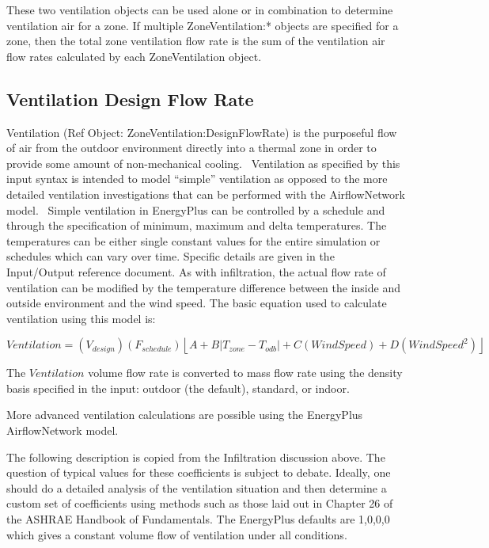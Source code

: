 These two ventilation objects can be used alone or in combination to determine ventilation air for a zone. If multiple ZoneVentilation:* objects are specified for a zone, then the total zone ventilation flow rate is the sum of the ventilation air flow rates calculated by each ZoneVentilation object.

\subsection{Ventilation Design Flow Rate}\label{ventilation-design-flow-rate}

Ventilation (Ref Object: ZoneVentilation:DesignFlowRate) is the purposeful flow of air from the outdoor environment directly into a thermal zone in order to provide some amount of non-mechanical cooling.~ Ventilation as specified by this input syntax is intended to model ``simple'' ventilation as opposed to the more detailed ventilation investigations that can be performed with the AirflowNetwork model.~ Simple ventilation in EnergyPlus can be controlled by a schedule and through the specification of minimum, maximum and delta temperatures. The temperatures can be either single constant values for the entire simulation or schedules which can vary over time. Specific details are given in the Input/Output reference document. As with infiltration, the actual flow rate of ventilation can be modified by the temperature difference between the inside and outside environment and the wind speed. The basic equation used to calculate ventilation using this model is:

\begin{equation}
Ventilation = \left( {{V_{design}}} \right)\left( {{F_{schedule}}} \right)\left\lfloor {A + B\left| {{T_{zone}} - {T_{odb}}} \right| + C\left( {WindSpeed} \right) + D\left( {WindSpee{d^2}} \right)} \right\rfloor
\end{equation}

The $Ventilation$ volume flow rate is converted to mass flow rate using the density basis specified in the input: outdoor (the default), standard, or indoor.

More advanced ventilation calculations are possible using the EnergyPlus AirflowNetwork model.

The following description is copied from the Infiltration discussion above. The question of typical values for these coefficients is subject to debate. Ideally, one should do a detailed analysis of the ventilation situation and then determine a custom set of coefficients using methods such as those laid out in Chapter 26 of the ASHRAE Handbook of Fundamentals. The EnergyPlus defaults are 1,0,0,0 which gives a constant volume flow of ventilation under all conditions.

